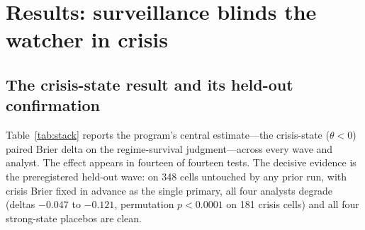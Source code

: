 \documentclass[11pt]{article}
\theoremstyle{remark}
\begin{document}
\section{Results: surveillance blinds the watcher in crisis}\label{sec:results}

\subsection{The crisis-state result and its held-out confirmation}

Table~\ref{tab:stack} reports the program's central estimate---the crisis-state ($\theta<0$) paired Brier delta on the regime-survival judgment---across every wave and analyst. The effect appears in fourteen of fourteen tests. The decisive evidence is the preregistered held-out wave: on 348 cells untouched by any prior run, with crisis Brier fixed in advance as the single primary, all four analysts degrade (deltas $-0.047$ to $-0.121$, permutation $p < 0.0001$ on 181 crisis cells) and all four strong-state placebos are clean.
\end{document}
